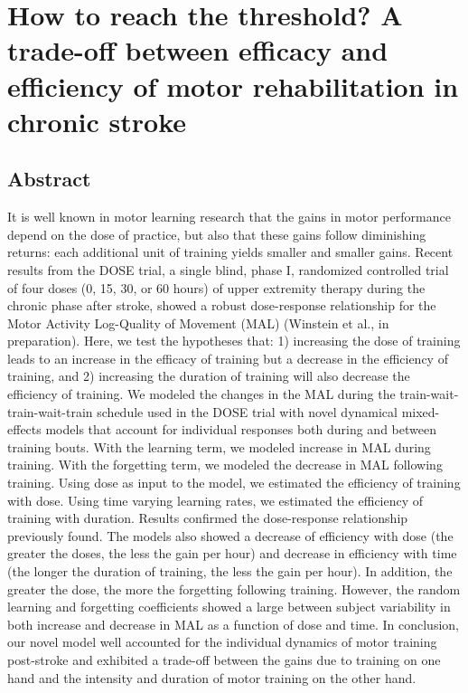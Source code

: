 \chapter{How to reach the threshold? A trade-off between efficacy and efficiency of motor rehabilitation in chronic stroke}
\label{cha:dose}

\section{Abstract}
It is well known in motor learning research that the gains in motor performance depend on the dose of practice, but also that these gains follow diminishing returns: each additional unit of training yields smaller and smaller gains. 
Recent results from the DOSE trial, a single blind, phase I, randomized controlled trial of four doses (0, 15, 30, or 60 hours) of upper extremity therapy during the chronic phase after stroke, showed a robust dose-response relationship for the Motor Activity Log-Quality of Movement (MAL) (Winstein et al., in preparation).  
Here, we test the hypotheses that: 1) increasing the dose of training leads to an increase in the efficacy of training but a decrease in the efficiency of training, and 2) increasing the duration of training will also decrease the efficiency of training. 
We modeled the changes in the MAL during the train-wait-train-wait-train schedule used in the DOSE trial with novel dynamical mixed-effects models that account for individual responses both during and between training bouts. 
With the learning term, we modeled increase in MAL during training.  
With the forgetting term, we modeled the decrease in MAL following training. 
Using dose as input to the model, we estimated the efficiency of training with dose. 
Using time varying learning rates, we estimated the efficiency of training with duration. 
Results confirmed the dose-response relationship previously found. 
The models also showed a decrease of efficiency with dose (the greater the doses, the less the gain per hour) and decrease in efficiency with time (the longer the duration of training, the less the gain per hour). 
In addition, the greater the dose, the more the forgetting following training. 
However, the random learning and forgetting coefficients showed a large between subject variability in both increase and decrease in MAL as a function of dose and time. 
In conclusion, our novel model well accounted for the individual dynamics of motor training post-stroke and exhibited a trade-off between the gains due to training on one hand and the intensity and duration of motor training on the other hand. 


